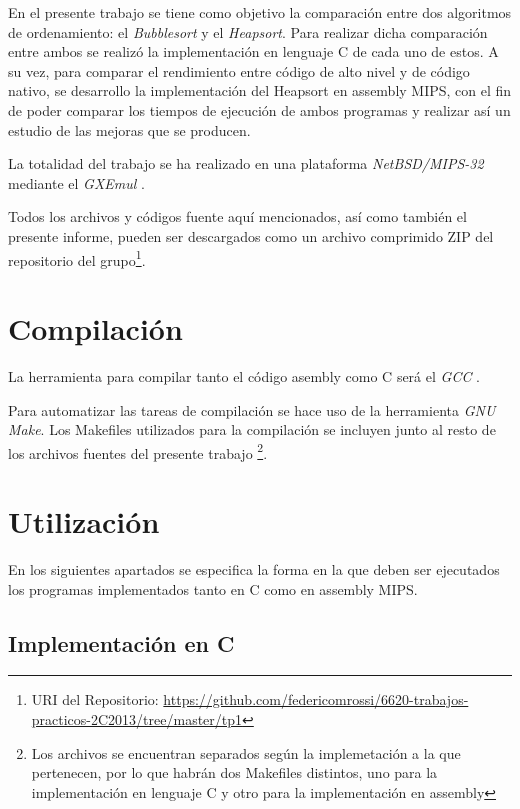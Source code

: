 \documentclass{article}
\begin{document}
	En el presente trabajo se tiene como objetivo la comparación entre dos algoritmos de ordenamiento: el \textit{Bubblesort}\cite{BS} y el \textit{Heapsort}\cite{HS}.
	Para realizar dicha comparación entre ambos se realizó la implementación en lenguaje C de cada uno de estos. A su vez, para comparar el rendimiento entre código de alto nivel y de código nativo, se desarrollo la implementación del Heapsort en assembly MIPS, con el fin de poder comparar los tiempos de ejecución de ambos programas y realizar así un estudio de las mejoras que se producen.
	\par
	La totalidad del trabajo se ha realizado en una plataforma \textit{NetBSD/MIPS-32} mediante el \textit{GXEmul} \cite{GXEMUL}.
	\par
	Todos los archivos y códigos fuente aquí mencionados, así como también el presente informe, pueden ser descargados como un archivo comprimido ZIP del repositorio del grupo\footnote{URI del Repositorio: \url{https://github.com/federicomrossi/6620-trabajos-practicos-2C2013/tree/master/tp1}}.
\bigskip




\section{Compilación}
	
	
	La herramienta para compilar tanto el código asembly como C será el \textit{GCC} \cite{GCC}. 
	\par
	Para automatizar las tareas de compilación se hace uso de la herramienta \textit{GNU Make}. Los Makefiles utilizados para la compilación se incluyen junto al resto de los archivos fuentes del presente trabajo \footnote{Los archivos se encuentran separados según la implemetación a la que pertenecen, por lo que habrán dos Makefiles distintos, uno para la implementación en lenguaje C y otro para la implementación en assembly}.
\bigskip



\section{Utilización}
	
	En los siguientes apartados se especifica la forma en la que deben ser ejecutados los programas implementados tanto en C como en assembly MIPS.
\medskip


\subsection{Implementación en C}
\end{document}
